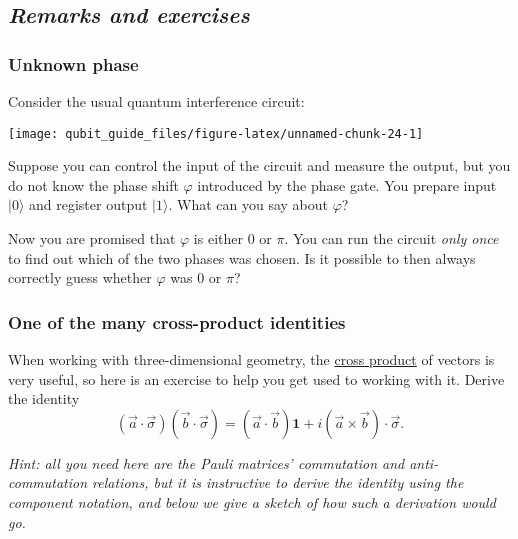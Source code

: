 \documentclass[fleqn]{article}
\begin{document}
\hypertarget{remarks-and-exercises-qubits}{%
\subsection{\texorpdfstring{\emph{Remarks and exercises}}{Remarks and exercises}}\label{remarks-and-exercises-qubits}}

\hypertarget{unknown-phase}{%
\subsubsection{Unknown phase}\label{unknown-phase}}

Consider the usual quantum interference circuit:

\begin{center}\texttt{[image: qubit\_guide\_files/figure-latex/unnamed-chunk-24-1]} \end{center}

Suppose you can control the input of the circuit and measure the output, but you do not know the phase shift \(\varphi\) introduced by the phase gate.
You prepare input \(|0\rangle\) and register output \(|1\rangle\).
What can you say about \(\varphi\)?

Now you are promised that \(\varphi\) is either \(0\) or \(\pi\).
You can run the circuit \emph{only once} to find out which of the two phases was chosen.
Is it possible to then always correctly guess whether \(\varphi\) was \(0\) or \(\pi\)?

\hypertarget{cross-product-identity}{%
\subsubsection{One of the many cross-product identities}\label{cross-product-identity}}

When working with three-dimensional geometry, the \href{https://en.wikipedia.org/wiki/Cross_product}{cross product} of vectors is very useful, so here is an exercise to help you get used to working with it.
Derive the identity
\[
  (\vec{a}\cdot\vec{\sigma})(\vec{b}\cdot\vec{\sigma})
  = (\vec{a}\cdot\vec{b})\mathbf{1}+ i(\vec{a}\times \vec{b})\cdot \vec{\sigma}.
\]

\emph{Hint: all you need here are the Pauli matrices' commutation and anti-commutation relations, but it is instructive to derive the identity using the component notation, and below we give a sketch of how such a derivation would go.}
\end{document}
